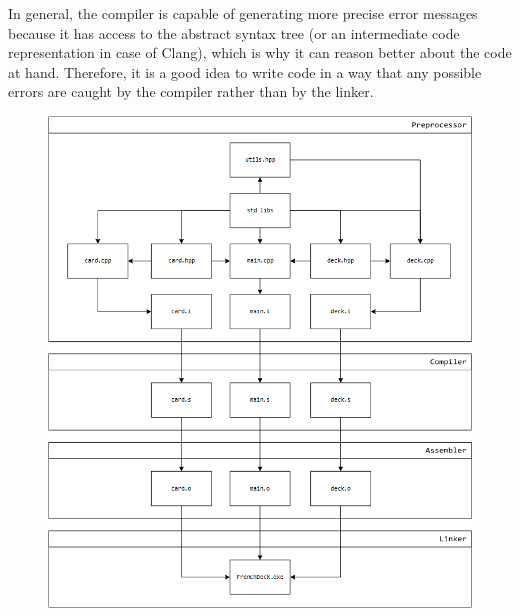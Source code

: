 In general, the compiler is capable of generating more precise error messages because
it has access to the abstract syntax tree (or an intermediate code representation
in case of Clang), which is why it can reason better about the code at hand. Therefore,
it is a good idea to write code in a way that any possible errors are caught by
the compiler rather than by the linker.

\begin{figure}[ht]
    \centering
    \includegraphics[width=1\textwidth]{images/FrenchDeck.png}
\end{figure}
